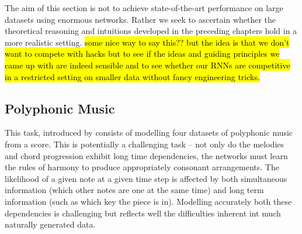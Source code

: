 The aim of this section is not to achieve state-of-the-art performance on
large datasets using enormous networks. Rather we seek to ascertain whether the
theoretical reasoning and intuitions developed in the preceding chapters hold
in a more realistic setting. \hl{some nice way to say this?? but the idea is
that we don't want to compete with hacks but to see if the ideas and guiding
principles we came up with are indeed sensible and to see whether our RNNs are
competitive in a restricted setting on smaller data without fancy engineering
tricks.}

\subsection{Polyphonic Music}
This task, introduced by 
\autocite{Boulanger-Lewandowski2012} consists of modelling four datasets of
polyphonic music from a score. This is potentially a challenging task -- not
only do the melodies and chord progression exhibit long time dependencies, the
networks must learn the rules of harmony to produce appropriately consonant
arrangements. The likelihood of a given note at a given time step is affected
by both simultaneous information (which other notes are one at the same time)
and long term information (such as which key the piece is in). Modelling accurately
both these dependencies is challenging but reflects well the difficulties inherent
int much naturally generated data.



